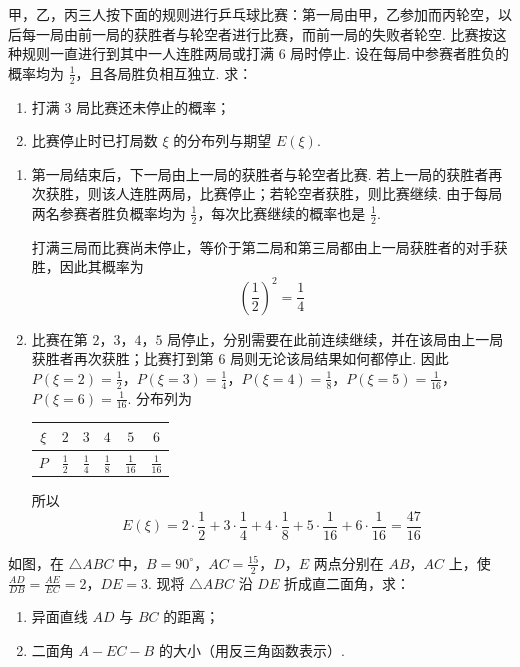 \begin{problem}
甲，乙，丙三人按下面的规则进行乒乓球比赛：第一局由甲，乙参加而丙轮空，以后每一局由前一局的获胜者与轮空者进行比赛，而前一局的失败者轮空. 比赛按这种规则一直进行到其中一人连胜两局或打满 \(6\) 局时停止. 设在每局中参赛者胜负的概率均为 \(\frac{1}{2}\)，且各局胜负相互独立. 求：
\begin{enumerate}
\item 打满 \(3\) 局比赛还未停止的概率；
\item 比赛停止时已打局数 \( \xi \) 的分布列与期望 \(E(\xi)\).
\end{enumerate}
\end{problem}

\begin{solution}
\begin{enumerate}
\item 第一局结束后，下一局由上一局的获胜者与轮空者比赛. 若上一局的获胜者再次获胜，则该人连胜两局，比赛停止；若轮空者获胜，则比赛继续. 由于每局两名参赛者胜负概率均为 \(\frac{1}{2}\)，每次比赛继续的概率也是 \(\frac{1}{2}\).

打满三局而比赛尚未停止，等价于第二局和第三局都由上一局获胜者的对手获胜，因此其概率为
\[
\left(\frac{1}{2}\right)^{2}=\frac{1}{4}
\]

\item 比赛在第 \(2\)，\(3\)，\(4\)，\(5\) 局停止，分别需要在此前连续继续，并在该局由上一局获胜者再次获胜；比赛打到第 \(6\) 局则无论该局结果如何都停止. 因此
\(P(\xi=2)=\frac{1}{2}\)，\(P(\xi=3)=\frac{1}{4}\)，\(P(\xi=4)=\frac{1}{8}\)，\(P(\xi=5)=\frac{1}{16}\)，\(P(\xi=6)=\frac{1}{16}\).
分布列为
\begin{center}
\begin{tabular}{c|ccccc}
\(\xi\) & \(2\) & \(3\) & \(4\) & \(5\) & \(6\) \\
\hline
\(P\) & \(\frac{1}{2}\) & \(\frac{1}{4}\) & \(\frac{1}{8}\) & \(\frac{1}{16}\) & \(\frac{1}{16}\)
\end{tabular}
\end{center}
所以
\[
E(\xi)=2\cdot\frac{1}{2}+3\cdot\frac{1}{4}+4\cdot\frac{1}{8}+5\cdot\frac{1}{16}+6\cdot\frac{1}{16}=\frac{47}{16}
\]
\end{enumerate}
\end{solution}

\begin{problem}
如图，在 \(\triangle ABC\) 中，\(B = 90^{\circ}\)，\(AC = \frac{15}{2}\)，\(D\)，\(E\) 两点分别在 \(AB\)，\(AC\) 上，使 \(\frac{AD}{DB} = \frac{AE}{EC} = 2\)，\(DE = 3\). 现将 \(\triangle ABC\) 沿 \(DE\) 折成直二面角，求：
\begin{enumerate}
\item 异面直线 \(AD\) 与 \(BC\) 的距离；
\item 二面角 \(A - EC - B\) 的大小（用反三角函数表示）.
\end{enumerate}

\FloatBarrier
\end{problem}


